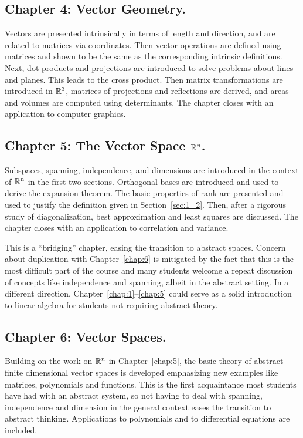 \subsection*{Chapter 4: Vector Geometry.}


Vectors are presented intrinsically in 
terms of length and direction, and are related to matrices via 
coordinates. Then vector operations are defined using matrices and shown
 to be the same as the corresponding intrinsic definitions. Next, dot 
products and projections are introduced to solve problems about lines 
and planes. This leads to the cross product. Then matrix transformations
 are introduced in $\mathbb{R}^3$,
 matrices of projections and reflections are derived, and areas and 
volumes are computed using determinants. The chapter closes with an 
application to computer graphics.



\subsection*{Chapter 5: The Vector Space $\mathbb{R}^n$.}


Subspaces, spanning, independence, and dimensions are introduced in the context of $\mathbb{R}^n$
 in the first two sections. Orthogonal bases are introduced and used to 
derive the expansion theorem. The basic properties of rank are presented
 and used to justify the definition given in Section~\ref{sec:1_2}.
 Then, after a rigorous study of diagonalization, best approximation and
 least squares are discussed. The chapter closes with an application to 
correlation and variance.

This is a ``bridging'' chapter, easing the transition to abstract spaces. Concern about duplication with Chapter~\ref{chap:6}
 is mitigated by the fact that this is the most difficult part of the 
course and many students welcome a repeat discussion of concepts like 
independence and spanning, albeit in the abstract setting. In a 
different direction, Chapter~\ref{chap:1}--\ref{chap:5} could serve as a solid introduction to linear algebra for students not requiring abstract theory.



\subsection*{Chapter 6: Vector Spaces.}


Building on the work on $\mathbb{R}^n$ in Chapter~\ref{chap:5},
 the basic theory of abstract finite dimensional vector spaces is 
developed emphasizing new examples like matrices, polynomials and 
functions. This is the first acquaintance most students have had with an
 abstract system, so not having to deal with spanning, independence and 
dimension in the general context eases the transition to abstract 
thinking. Applications to polynomials and to differential equations are 
included.



